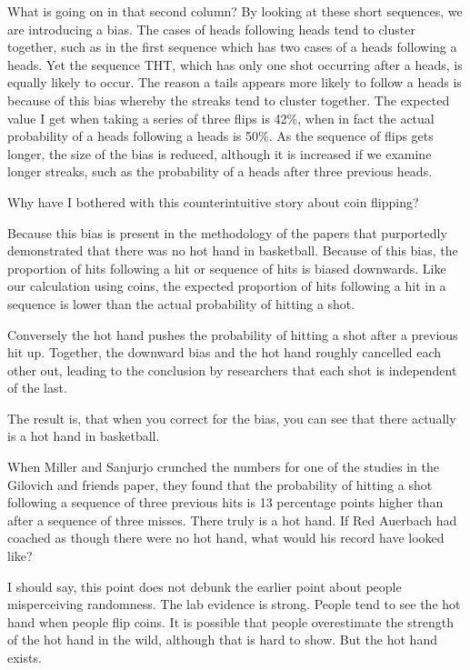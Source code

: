 \documentclass[
]{book}
\begin{document}
What is going on in that second column? By looking at these short sequences, we are introducing a bias. The cases of heads following heads tend to cluster together, such as in the first sequence which has two cases of a heads following a heads. Yet the sequence THT, which has only one shot occurring after a heads, is equally likely to occur. The reason a tails appears more likely to follow a heads is because of this bias whereby the streaks tend to cluster together. The expected value I get when taking a series of three flips is 42\%, when in fact the actual probability of a heads following a heads is 50\%. As the sequence of flips gets longer, the size of the bias is reduced, although it is increased if we examine longer streaks, such as the probability of a heads after three previous heads.

Why have I bothered with this counterintuitive story about coin flipping?

Because this bias is present in the methodology of the papers that purportedly demonstrated that there was no hot hand in basketball. Because of this bias, the proportion of hits following a hit or sequence of hits is biased downwards. Like our calculation using coins, the expected proportion of hits following a hit in a sequence is lower than the actual probability of hitting a shot.

Conversely the hot hand pushes the probability of hitting a shot after a previous hit up. Together, the downward bias and the hot hand roughly cancelled each other out, leading to the conclusion by researchers that each shot is independent of the last.

The result is, that when you correct for the bias, you can see that there actually is a hot hand in basketball.

When Miller and Sanjurjo crunched the numbers for one of the studies in the Gilovich and friends paper, they found that the probability of hitting a shot following a sequence of three previous hits is 13 percentage points higher than after a sequence of three misses. There truly is a hot hand. If Red Auerbach had coached as though there were no hot hand, what would his record have looked like?

I should say, this point does not debunk the earlier point about people misperceiving randomness. The lab evidence is strong. People tend to see the hot hand when people flip coins. It is possible that people overestimate the strength of the hot hand in the wild, although that is hard to show. But the hot hand exists.
\end{document}
